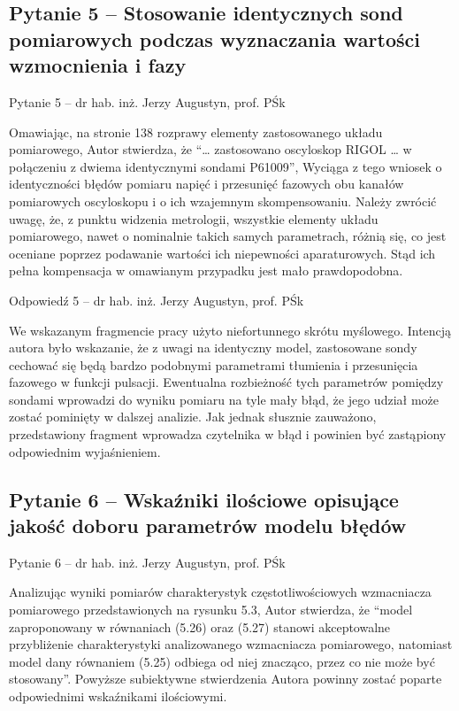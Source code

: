 \documentclass[12pt, polish, aspectratio = 169]{slides}
\begin{document}
\subsection{Pytanie 5 -- Stosowanie identycznych sond pomiarowych podczas wyznaczania wartości wzmocnienia i fazy}

\begin{frame}{Pytanie 5 -- dr hab. inż. Jerzy Augustyn, prof. PŚk}\large
\begin{justify}
Omawiając, na stronie 138 rozprawy elementy zastosowanego układu pomiarowego, Autor stwierdza, że \enquote{\dots{} zastosowano oscyloskop RIGOL \dots{} w połączeniu z dwiema identycznymi sondami P61009}, Wyciąga z tego wniosek o identyczności błędów pomiaru napięć i przesunięć fazowych obu kanałów pomiarowych oscyloskopu i o ich wzajemnym skompensowaniu. Należy zwrócić uwagę, że, z punktu widzenia metrologii, wszystkie elementy układu pomiarowego, nawet o nominalnie takich samych parametrach, różnią się, co jest oceniane poprzez podawanie wartości ich niepewności aparaturowych. Stąd ich pełna kompensacja w omawianym przypadku jest mało prawdopodobna.
\end{justify}
\end{frame}

\begin{frame}[allowframebreaks]{Odpowiedź 5 -- dr hab. inż. Jerzy Augustyn, prof. PŚk}\small
\begin{justify}
We wskazanym fragmencie pracy użyto niefortunnego skrótu myślowego. Intencją autora było wskazanie, że z uwagi na identyczny model, zastosowane sondy cechować się będą bardzo podobnymi parametrami tłumienia i przesunięcia fazowego w funkcji pulsacji. Ewentualna rozbieżność tych parametrów pomiędzy sondami wprowadzi do wyniku pomiaru na tyle mały błąd, że jego udział może zostać pominięty w dalszej analizie. Jak jednak słusznie zauważono, przedstawiony fragment wprowadza czytelnika w błąd i powinien być zastąpiony odpowiednim wyjaśnieniem.
\end{justify}
\end{frame}

\subsection{Pytanie 6 -- Wskaźniki ilościowe opisujące jakość doboru parametrów modelu błędów}

\begin{frame}{Pytanie 6 -- dr hab. inż. Jerzy Augustyn, prof. PŚk}\large
\begin{justify}
Analizując wyniki pomiarów charakterystyk częstotliwościowych wzmacniacza pomiarowego przedstawionych na rysunku 5.3, Autor stwierdza, że \enquote{model zaproponowany w równaniach (5.26) oraz (5.27) stanowi akceptowalne przybliżenie charakterystyki analizowanego wzmacniacza pomiarowego, natomiast model dany równaniem (5.25) odbiega od niej znacząco, przez co nie może być stosowany}. Powyższe subiektywne stwierdzenia Autora powinny zostać poparte odpowiednimi wskaźnikami ilościowymi.
\end{justify}
\end{frame}
\end{document}
